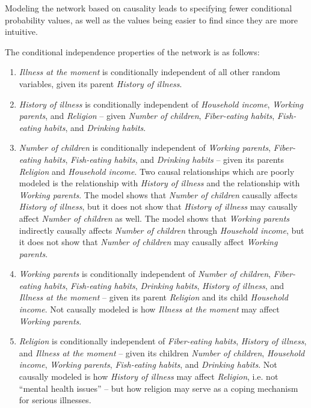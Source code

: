 Modeling the network based on causality leads to specifying fewer conditional probability values, as well as the values being easier to find since they are more intuitive.

The conditional independence properties of the network is as follows:

\begin{enumerate}
\item \textit{Illness at the moment} is conditionally independent of all other random variables, given its parent \textit{History of illness}.

\item \textit{History of illness} is conditionally independent of \textit{Household income}, \textit{Working parents}, and \textit{Religion} -- given \textit{Number of children}, \textit{Fiber-eating habits}, \textit{Fish-eating habits}, and \textit{Drinking habits}.

\item \textit{Number of children} is conditionally independent of \textit{Working parents}, \textit{Fiber-eating habits}, \textit{Fish-eating habits}, and \textit{Drinking habits} -- given its parents \textit{Religion} and \textit{Household income}. Two causal relationships which are poorly modeled is the relationship with \textit{History of illness} and the relationship with \textit{Working parents}. The model shows that \textit{Number of children} causally affects \textit{History of illness}, but it does not show that \textit{History of illness} may causally affect \textit{Number of children} as well. The model shows that \textit{Working parents} indirectly causally affects \textit{Number of children} through \textit{Household income}, but it does not show that \textit{Number of children} may causally affect \textit{Working parents}.

\item \textit{Working parents} is conditionally independent of \textit{Number of children}, \textit{Fiber-eating habits}, \textit{Fish-eating habits}, \textit{Drinking habits}, \textit{History of illness}, and \textit{Illness at the moment} -- given its parent \textit{Religion} and its child \textit{Household income}. Not causally modeled is how \textit{Illness at the moment} may affect \textit{Working parents}.

\item \textit{Religion} is conditionally independent of \textit{Fiber-eating habits}, \textit{History of illness}, and \textit{Illness at the moment} -- given its children \textit{Number of children}, \textit{Household income}, \textit{Working parents}, \textit{Fish-eating habits}, and \textit{Drinking habits}. Not causally modeled is how \textit{History of illness} may affect \textit{Religion}, i.e. not ``mental health issues'' -- but how religion may serve as a coping mechanism for serious illnesses.


\end{enumerate}
